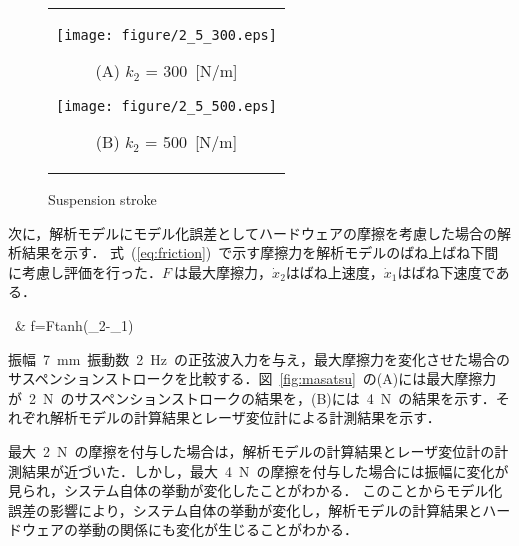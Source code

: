 \documentclass{article_vdlab_sotsuron_youshi}
\begin{document}
\begin{figure}[h]
    \begin{tabular}{c}
      \begin{minipage}{0.5\hsize}
	\begin{center}
	  \texttt{[image: figure/2\_5\_300.eps]}
	\end{center}
	\begin{center}
	  \vspace{-2mm}
	  \ (A) $k_2$ = 300~[N/m]\
	  \end{center}
      \end{minipage}
      \begin{minipage}{0.5\hsize}
	\begin{center}
	  \texttt{[image: figure/2\_5\_500.eps]}
	  \end{center}
	  \begin{center}
	  \vspace{-2mm}
	  \ (B)  $k_2$ = 500~[N/m]\
	  \end{center}
      \end{minipage}
    \end{tabular}
    \vspace{-1mm}
    \caption{Suspension stroke}
    \label{fig:bane}
\end{figure}


\par
次に，解析モデルにモデル化誤差としてハードウェアの摩擦を考慮した場合の解析結果を示す．
式~(\ref{eq:friction})~で示す摩擦力を解析モデルのばね上ばね下間に考慮し評価を行った．$F~$は最大摩擦力，$\dot{x}_2$はばね上速度，$\dot{x}_1$はばね下速度である．
\begin{flalign}
\label{eq:friction}
\ & f=Ftanh(_2-_1)
\end{flalign}

\par
振幅~7~mm~振動数~2~Hz~の正弦波入力を与え，最大摩擦力を変化させた場合のサスペンションストロークを比較する．図~\ref{fig:masatsu}~の(A)には最大摩擦力が~2~N~のサスペンションストロークの結果を，(B)には~4~N~の結果を示す．それぞれ解析モデルの計算結果とレーザ変位計による計測結果を示す．
\par
最大~2~N~の摩擦を付与した場合は，解析モデルの計算結果とレーザ変位計の計測結果が近づいた．しかし，最大~4~N~の摩擦を付与した場合には振幅に変化が見られ，システム自体の挙動が変化したことがわかる．
このことからモデル化誤差の影響により，システム自体の挙動が変化し，解析モデルの計算結果とハードウェアの挙動の関係にも変化が生じることがわかる．
\end{document}
